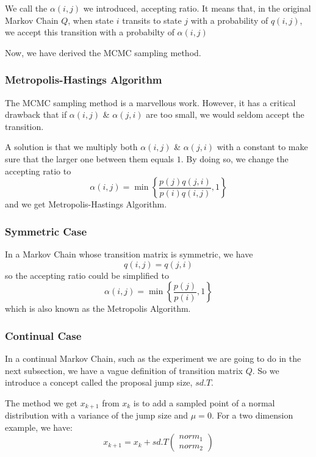 We call the $\alpha(i,j)$ we introduced, accepting ratio. It means that, in the original Markov Chain $Q$, when state $i$ transits to state $j$ with a probability of $q(i,j)$, we accept this transition with a probabilty of $\alpha(i,j)$

Now, we have derived the MCMC sampling method.

\subsubsection{Metropolis-Hastings Algorithm}
The MCMC sampling method is a marvellous work. However, it has a critical drawback that if $\alpha(i,j)$ \& $\alpha(j,i)$ are too small, we would seldom accept the transition.

A solution is that we multiply both $\alpha(i,j)$ \& $\alpha(j,i)$ with a constant to make sure that the larger one between them equals $1$. By doing so, we change the accepting ratio to
\begin{equation}
\alpha(i,j) = \min\left\{\frac{p(j)q(j,i)}{p(i)q(i,j)},1\right\}
\end{equation}
and we get Metropolis-Hastings Algorithm\cite{hastings1970monte}.

\subsubsection{Symmetric Case}
In a Markov Chain whose transition matrix is symmetric, we have
$$q(i,j)=q(j,i)$$
so the accepting ratio could be simplified to 
\begin{equation}
\alpha(i,j) = \min\left\{\frac{p(j)}{p(i)},1\right\}
\end{equation}
which is also known as the Metropolis Algorithm\cite{metropolis1953equation}.

\subsubsection{Continual Case}
In a continual Markov Chain, such as the experiment we are going to do in the next subsection, we have a vague definition of transition matrix $Q$. So we introduce a concept called the proposal jump size, $sd.T$.

The method we get $x_{k+1}$ from $x_{k}$ is to add a sampled point of a normal distribution with a variance of the jump size and $\mu=0$. For a two dimension example, we have:
\begin{equation}
x_{k+1} = x_{k} + sd.T \left( \begin{array}{ccc}
norm_{1} \\
norm_{2} \end{array} \right) 
\end{equation}


